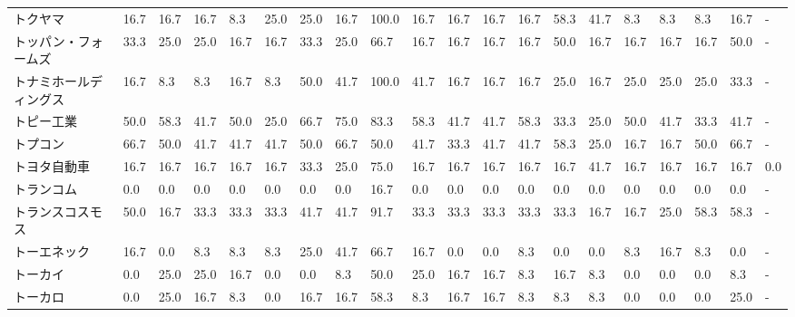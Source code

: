 \begin{tabular}{llllllllllllllllllll}
トクヤマ            &   16.7 &   16.7 &      16.7 &       8.3 &       25.0 &   25.0 &   16.7 &  100.0 &    16.7 &    16.7 &   16.7 &  16.7 &   58.3 &    41.7 &     8.3 &   8.3 &   8.3 &  16.7 &     - \\
トッパン・フォームズ      &   33.3 &   25.0 &      25.0 &      16.7 &       16.7 &   33.3 &   25.0 &   66.7 &    16.7 &    16.7 &   16.7 &  16.7 &   50.0 &    16.7 &    16.7 &  16.7 &  16.7 &  50.0 &     - \\
トナミホールディングス     &   16.7 &    8.3 &       8.3 &      16.7 &        8.3 &   50.0 &   41.7 &  100.0 &    41.7 &    16.7 &   16.7 &  16.7 &   25.0 &    16.7 &    25.0 &  25.0 &  25.0 &  33.3 &     - \\
トピー工業           &   50.0 &   58.3 &      41.7 &      50.0 &       25.0 &   66.7 &   75.0 &   83.3 &    58.3 &    41.7 &   41.7 &  58.3 &   33.3 &    25.0 &    50.0 &  41.7 &  33.3 &  41.7 &     - \\
トプコン            &   66.7 &   50.0 &      41.7 &      41.7 &       41.7 &   50.0 &   66.7 &   50.0 &    41.7 &    33.3 &   41.7 &  41.7 &   58.3 &    25.0 &    16.7 &  16.7 &  50.0 &  66.7 &     - \\
トヨタ自動車          &   16.7 &   16.7 &      16.7 &      16.7 &       16.7 &   33.3 &   25.0 &   75.0 &    16.7 &    16.7 &   16.7 &  16.7 &   16.7 &    41.7 &    16.7 &  16.7 &  16.7 &  16.7 &   0.0 \\
トランコム           &    0.0 &    0.0 &       0.0 &       0.0 &        0.0 &    0.0 &    0.0 &   16.7 &     0.0 &     0.0 &    0.0 &   0.0 &    0.0 &     0.0 &     0.0 &   0.0 &   0.0 &   0.0 &     - \\
トランスコスモス        &   50.0 &   16.7 &      33.3 &      33.3 &       33.3 &   41.7 &   41.7 &   91.7 &    33.3 &    33.3 &   33.3 &  33.3 &   33.3 &    16.7 &    16.7 &  25.0 &  58.3 &  58.3 &     - \\
トーエネック          &   16.7 &    0.0 &       8.3 &       8.3 &        8.3 &   25.0 &   41.7 &   66.7 &    16.7 &     0.0 &    0.0 &   8.3 &    0.0 &     0.0 &     8.3 &  16.7 &   8.3 &   0.0 &     - \\
トーカイ            &    0.0 &   25.0 &      25.0 &      16.7 &        0.0 &    0.0 &    8.3 &   50.0 &    25.0 &    16.7 &   16.7 &   8.3 &   16.7 &     8.3 &     0.0 &   0.0 &   0.0 &   8.3 &     - \\
トーカロ            &    0.0 &   25.0 &      16.7 &       8.3 &        0.0 &   16.7 &   16.7 &   58.3 &     8.3 &    16.7 &   16.7 &   8.3 &    8.3 &     8.3 &     0.0 &   0.0 &   0.0 &  25.0 &     - \\

\end{tabular}
